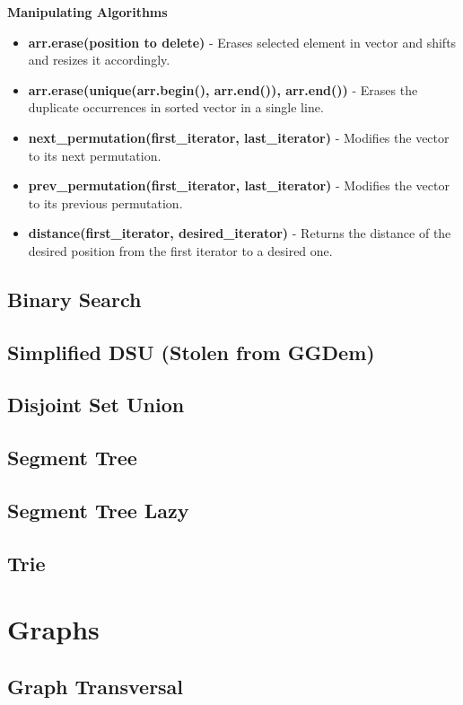 \textbf{Manipulating Algorithms}
\begin{itemize}
\item \textbf{arr.erase(position to delete)} - Erases selected element in vector and shifts and resizes it accordingly.
\item \textbf{arr.erase(unique(arr.begin(), arr.end()), arr.end())} - Erases the duplicate occurrences in sorted vector in a single line.
\item \textbf{next\_permutation(first\_iterator, last\_iterator)} - Modifies the vector to its next permutation.
\item \textbf{prev\_permutation(first\_iterator, last\_iterator)} - Modifies the vector to its previous permutation.
\item \textbf{distance(first\_iterator, desired\_iterator)} - Returns the distance of the desired position from the first iterator to a desired one.
\end{itemize}
\subsection{Binary Search}
\subsection{Simplified DSU (Stolen from GGDem)}
\subsection{Disjoint Set Union}
\subsection{Segment Tree}
\subsection{Segment Tree Lazy}
\subsection{Trie}


\section{Graphs}
\subsection{Graph Transversal}
